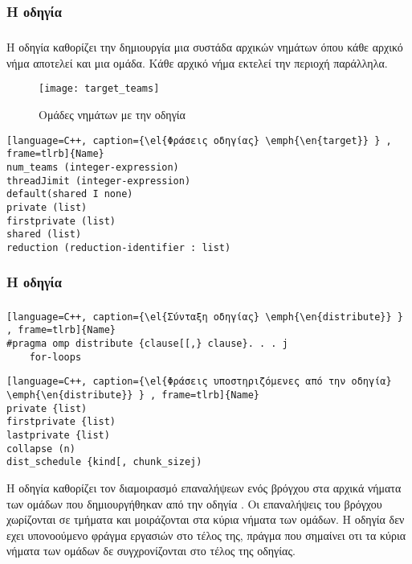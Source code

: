 \subsubsection{Η οδηγία }
\subparagraph{}
Η οδηγία \emph{} καθορίζει την δημιουργία μια συστάδα αρχικών νημάτων όπου κάθε αρχικό νήμα αποτελεί και μια ομάδα. Κάθε αρχικό νήμα εκτελεί την περιοχή παράλληλα.

\begin{figure}[h]
\texttt{[image: target\_teams]}
\centering
\captionsetup{justification=centering, singlelinecheck=false}
	\caption{Ομάδες νημάτων με την οδηγία \emph{}}
\label{fig:target_teams}
\end{figure}


\begin{lstlisting}[language=C++, caption={\el{Φράσεις οδηγίας} \emph{\en{target}} } , frame=tlrb]{Name}
num_teams (integer-expression)
threadJimit (integer-expression)
default(shared I none)
private (list)
firstprivate (list)
shared (list)
reduction (reduction-identifier : list)
\end{lstlisting}

\subsubsection{Η οδηγία }
\subparagraph{}


\begin{lstlisting}[language=C++, caption={\el{Σύνταξη οδηγίας} \emph{\en{distribute}} } , frame=tlrb]{Name}
#pragma omp distribute {clause[[,} clause}. . . j
	for-loops
\end{lstlisting}


\begin{lstlisting}[language=C++, caption={\el{Φράσεις υποστηριζόμενες από την οδηγία} \emph{\en{distribute}} } , frame=tlrb]{Name}
private {list)
firstprivate {list)
lastprivate {list)
collapse (n)
dist_schedule {kind[, chunk_sizej)
\end{lstlisting}

Η οδηγία  \emph{} καθορίζει τον διαμοιρασμό  επαναλήψεων ενός βρόγχου στα αρχικά νήματα των ομάδων που δημιουργήθηκαν από την οδηγία \emph{}. Οι επαναλήψεις του βρόγχου χωρίζονται σε τμήματα και μοιράζονται στα κύρια νήματα των ομάδων. Η οδηγία \emph{} δεν εχει υπονοούμενο φράγμα εργασιών στο τέλος της, πράγμα που σημαίνει οτι τα κύρια νήματα των ομάδων δε συγχρονίζονται στο τέλος της οδηγίας.

